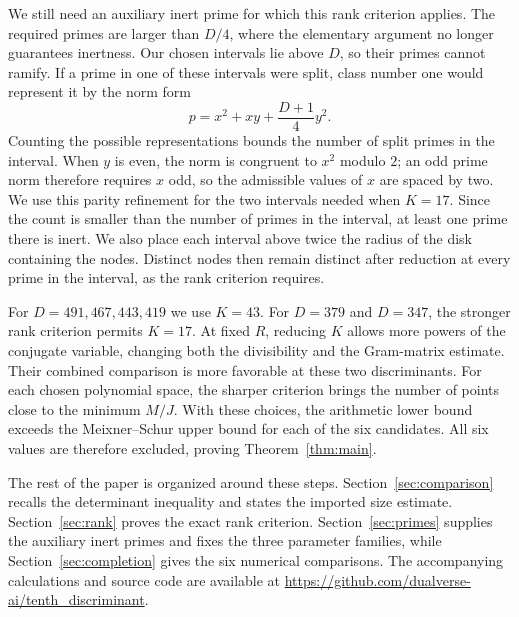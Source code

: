 We still need an auxiliary inert prime for which this rank criterion
applies.  The required primes are larger than $D/4$, where the elementary
argument no longer guarantees inertness.  Our chosen intervals lie above
$D$, so their primes cannot ramify.  If a prime in one of these intervals
were split, class number one would represent it by the norm form
\[
 p=x^2+xy+\frac{D+1}{4}y^2.
\]
Counting the possible representations bounds the number of split primes
in the interval.  When $y$ is even, the
norm is congruent to $x^2$ modulo $2$; an odd prime norm therefore requires
$x$ odd, so the admissible values of $x$ are spaced by two.  We use this parity refinement
for the two intervals needed when $K=17$.  Since the count is smaller than
the number of primes in the interval, at least one prime there is inert.
We also place each interval above twice the radius of the disk containing
the nodes.  Distinct nodes then remain distinct after reduction at every
prime in the interval, as the rank criterion requires.

For $D=491,467,443,419$ we use $K=43$.  For $D=379$ and $D=347$, the
stronger rank criterion permits $K=17$. At fixed $R$, reducing $K$ allows more powers of the conjugate
variable, changing both the divisibility and the Gram-matrix estimate. Their combined
comparison is more favorable at these two discriminants.  For each chosen polynomial space, the sharper criterion brings the
number of points close to the minimum $M/J$. With these
choices, the arithmetic lower bound exceeds the Meixner--Schur upper bound
for each of the six candidates.  All six values are therefore excluded,
proving Theorem~\ref{thm:main}.

The rest of the paper is organized around these steps.  Section~\ref{sec:comparison}
recalls the determinant inequality and states the imported size estimate.
Section~\ref{sec:rank} proves the exact rank criterion.
Section~\ref{sec:primes} supplies the auxiliary inert primes and fixes
the three parameter families, while Section~\ref{sec:completion} gives
the six numerical comparisons.  The accompanying calculations
and source code are available at
\url{https://github.com/dualverse-ai/tenth_discriminant}.
